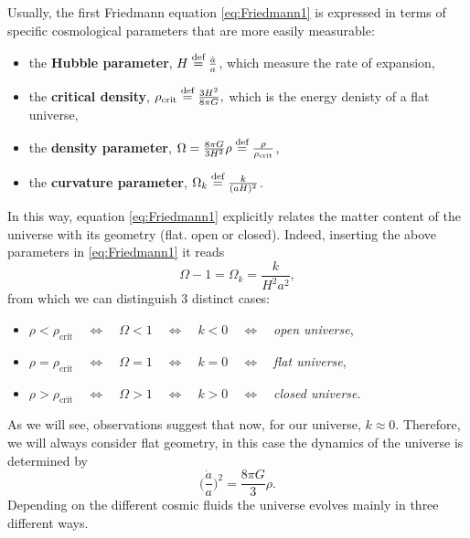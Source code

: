 Usually, the first Friedmann equation \eqref{eq:Friedmann1} is expressed in terms of specific cosmological parameters that are more easily measurable:
\begin{itemize}
    \item the \textbf{Hubble parameter}, $H\stackrel{\text{def}}{=}\frac{\dot a}{a}$, which measure the rate of expansion,
    \item the \textbf{critical density}, $\rho_{\text{crit}}\stackrel{\text{def}}{=}\frac{3H^2}{8\pi G},$ which is the energy denisty of a flat universe,
    \item the \textbf{density parameter}, $\Omega=\frac{8\pi G}{3H^2}\rho\stackrel{\text{def}}{=}\frac{\rho}{\rho_{\text{crit}}}$, 
    \item the \textbf{curvature parameter}, $\Omega_k\stackrel{\text{def}}{=}\frac{k}{(aH)^2}$.
\end{itemize}
In this way, equation \eqref{eq:Friedmann1} explicitly relates the matter content of the universe with its geometry (flat. open or closed). Indeed, inserting the above parameters in \eqref{eq:Friedmann1} it reads
\begin{equation}\label{eq:Friedmann_Omega}
    \boxed{\Omega-1=\Omega_k=\frac{k}{H^2a^2}},
\end{equation}
from which we can distinguish 3 distinct cases:
\begin{itemize}
    \item $\rho<\rho_{\text{crit}}\quad\Leftrightarrow\quad \Omega<1 \quad\Leftrightarrow\quad k<0 \quad\Leftrightarrow\quad $\emph{open universe},
    \item  $\rho=\rho_{\text{crit}}\quad\Leftrightarrow\quad \Omega=1 \quad\Leftrightarrow\quad k=0 \quad\Leftrightarrow\quad $\emph{flat universe},
    \item  $\rho>\rho_{\text{crit}}\quad\Leftrightarrow\quad \Omega>1 \quad\Leftrightarrow\quad k>0 \quad\Leftrightarrow\quad $\emph{closed universe}.
\end{itemize} 
As we will see, observations suggest that now, for our universe, $k\approx0$. Therefore, we will always consider flat geometry, in this case the dynamics of the universe is determined by $$\bigg(\frac{\dot a }{a}\bigg)^2=\frac{8\pi G}{3}\rho. $$
Depending on the different cosmic fluids the universe evolves mainly in three different ways.
